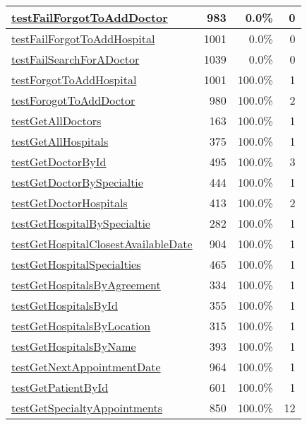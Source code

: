 \begin{longtable}{|l|r|r|r|}
\hline
\hyperref[testFailForgotToAddDoctor:983]{testFailForgotToAddDoctor} & 983&0.0\% & 0 \\
\hline
\hyperref[testFailForgotToAddHospital:1001]{testFailForgotToAddHospital} & 1001&0.0\% & 0 \\
\hline
\hyperref[testFailSearchForADoctor:1039]{testFailSearchForADoctor} & 1039&0.0\% & 0 \\
\hline
\hyperref[testForgotToAddHospital:1001]{testForgotToAddHospital} & 1001&100.0\% & 1 \\
\hline
\hyperref[testForogotToAddDoctor:980]{testForogotToAddDoctor} & 980&100.0\% & 2 \\
\hline
\hyperref[testGetAllDoctors:163]{testGetAllDoctors} & 163&100.0\% & 1 \\
\hline
\hyperref[testGetAllHospitals:375]{testGetAllHospitals} & 375&100.0\% & 1 \\
\hline
\hyperref[testGetDoctorById:495]{testGetDoctorById} & 495&100.0\% & 3 \\
\hline
\hyperref[testGetDoctorBySpecialtie:444]{testGetDoctorBySpecialtie} & 444&100.0\% & 1 \\
\hline
\hyperref[testGetDoctorHospitals:413]{testGetDoctorHospitals} & 413&100.0\% & 2 \\
\hline
\hyperref[testGetHospitalBySpecialtie:282]{testGetHospitalBySpecialtie} & 282&100.0\% & 1 \\
\hline
\hyperref[testGetHospitalClosestAvailableDate:904]{testGetHospitalClosestAvailableDate} & 904&100.0\% & 1 \\
\hline
\hyperref[testGetHospitalSpecialties:465]{testGetHospitalSpecialties} & 465&100.0\% & 1 \\
\hline
\hyperref[testGetHospitalsByAgreement:334]{testGetHospitalsByAgreement} & 334&100.0\% & 1 \\
\hline
\hyperref[testGetHospitalsById:355]{testGetHospitalsById} & 355&100.0\% & 1 \\
\hline
\hyperref[testGetHospitalsByLocation:315]{testGetHospitalsByLocation} & 315&100.0\% & 1 \\
\hline
\hyperref[testGetHospitalsByName:393]{testGetHospitalsByName} & 393&100.0\% & 1 \\
\hline
\hyperref[testGetNextAppointmentDate:964]{testGetNextAppointmentDate} & 964&100.0\% & 1 \\
\hline
\hyperref[testGetPatientById:601]{testGetPatientById} & 601&100.0\% & 1 \\
\hline
\hyperref[testGetSpecialtyAppointments:850]{testGetSpecialtyAppointments} & 850&100.0\% & 12 \\

\end{longtable}
